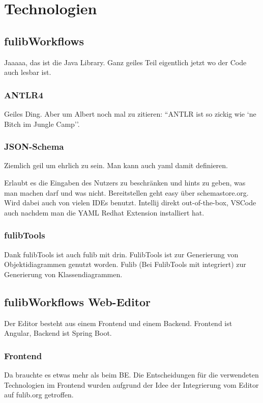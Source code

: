 \chapter{Technologien}\label{ch:technologien}


\section{fulibWorkflows}\label{sec:fulibworkflows}
Jaaaaa, das ist die Java Library.
Ganz geiles Teil eigentlich jetzt wo der Code auch lesbar ist.

\subsection{ANTLR4}\label{subsec:antlr4}
Geiles Ding.
Aber um Albert noch mal zu zitieren: ``ANTLR ist so zickig wie `ne Bitch im Jungle Camp''.

\subsection{JSON-Schema}\label{subsec:json-schema}
Ziemlich geil um ehrlich zu sein.
Man kann auch yaml damit definieren.

Erlaubt es die Eingaben des Nutzers zu beschränken und hints zu geben, was man machen darf
und was nicht.
Bereitstellen geht easy über schemastore.org.
Wird dabei auch von vielen IDEs benutzt.
Intellij direkt out-of-the-box, VSCode auch nachdem man die YAML Redhat Extension installiert hat.

\subsection{fulibTools}
Dank fulibTools ist auch fulib mit drin.
FulibTools ist zur Generierung von Objektidiagrammen genutzt worden.
Fulib (Bei FulibTools mit integriert) zur Generierung von Klassendiagrammen.

\section{fulibWorkflows Web-Editor}\label{sec:fulibworkflows-web-editor}
Der Editor besteht aus einem Frontend und einem Backend.
Frontend ist Angular, Backend ist Spring Boot.

\subsection{Frontend}\label{subsec:frontend}
Da brauchte es etwas mehr als beim BE\@.
Die Entscheidungen für die verwendeten Technologien im Frontend wurden aufgrund
der Idee der Integrierung vom Editor auf fulib.org getroffen.

